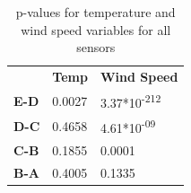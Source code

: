 \documentclass[a4paper]{article}
\begin{document}
{
\small
\begin{table}[htbp]
  \centering
  \caption{p-values for temperature and wind speed variables for all sensors}
  \begin{tabular}{lll}
                 & \textbf{Temp} & \textbf{Wind Speed}           \\
    \textbf{E-D} & 0.0027        & 3.37*10\textsuperscript{-212} \\
    \textbf{D-C} & 0.4658        & 4.61*10\textsuperscript{-09}                      \\
    \textbf{C-B} & 0.1855        & 0.0001                        \\
    \textbf{B-A} & 0.4005        & 0.1335                       
    \end{tabular}
    
\end{table}
}


\newpage


\end{document}
